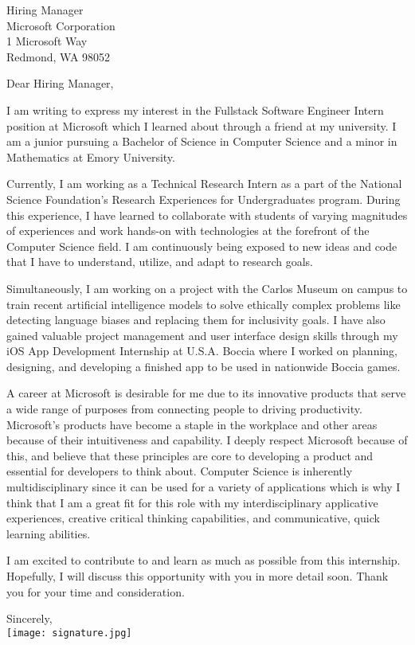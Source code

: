 \documentclass[letterpaper,12pt]{letter}
\date{}
\begin{document}
\begin{letter}{%
    Hiring Manager \\ 
	Microsoft Corporation \\
	1 Microsoft Way  \\
    Redmond, WA 98052
}

\opening{Dear Hiring Manager,}

I am writing to express my interest in the Fullstack Software Engineer Intern position at Microsoft
which I learned about through a friend at my university. I am a junior pursuing 
a Bachelor of Science in Computer Science and a minor in Mathematics at Emory University.

Currently, I am working as a Technical Research Intern as a part of the National Science Foundation's 
Research Experiences for Undergraduates program. During this experience, I have learned to 
collaborate with students of varying magnitudes of experiences and work hands-on with technologies at 
the forefront of the Computer Science field. I am continuously being exposed to new ideas 
and code that I have to understand, utilize, and adapt to research goals. 

Simultaneously, I am working on a project with the Carlos Museum on campus to train recent 
artificial intelligence models to solve ethically complex problems like detecting language biases and 
replacing them for inclusivity goals. I have also gained valuable project management 
and user interface design skills through my iOS App Development Internship at U.S.A. Boccia 
where I worked on planning, designing, and developing a finished app to be used in nationwide Boccia games. 

A career at Microsoft is desirable for me due to its innovative products that serve a wide range of purposes
from connecting people to driving productivity. Microsoft's products have become a staple in 
the workplace and other areas because of their intuitiveness and capability. I deeply respect Microsoft
because of this, and believe that these principles are core to developing a product and essential for developers to think about.
Computer Science is inherently multidisciplinary since it can be used for a variety of applications
which is why I think that I am a great fit for this role with my interdisciplinary applicative experiences, creative critical thinking capabilities,
and communicative, quick learning abilities. 

I am excited to contribute to and learn as much as possible from this internship. Hopefully, I will
discuss this opportunity with you in more detail soon. Thank you for your time and consideration.

\closing{Sincerely, \\
\vspace{10pt}
\texttt{[image: signature.jpg]}}


\end{letter}

\end{document}
